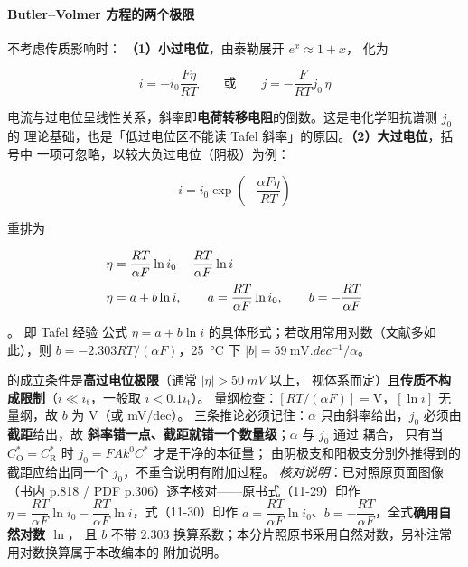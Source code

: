 \paragraph{Butler--Volmer 方程的两个极限} 不考虑传质影响时：
\textbf{（1）小过电位}，由泰勒展开 $e^x\approx1+x$， 化为

\begin{equation}
i=-i_0\frac{F\eta}{RT}
\qquad\text{或}\qquad
j=-\frac{F}{RT}j_0\,\eta
\label{eq:bv-linear}
\end{equation}

电流与过电位呈线性关系，斜率即\textbf{电荷转移电阻}的倒数。这是电化学阻抗谱测 $j_0$ 的
理论基础，也是「低过电位区不能读 Tafel 斜率」的原因。\textbf{（2）大过电位}，括号中
一项可忽略，以较大负过电位（阴极）为例：

\begin{equation}
i=i_0\exp\!\left(-\frac{\alpha F\eta}{RT}\right)
\label{eq:bv-cathodic}
\end{equation}

重排为

\begin{align}
\eta&=\frac{RT}{\alpha F}\ln i_0-\frac{RT}{\alpha F}\ln i
\label{eq:tafel}\\[2pt]
\eta&=a+b\ln i,\qquad
a=\frac{RT}{\alpha F}\ln i_0,\qquad b=-\frac{RT}{\alpha F}\notag
\end{align}

。 即 Tafel 经验
公式 $\eta=a+b\ln i$ 的具体形式；若改用常用对数（文献多如此），则
$b=-2.303RT/(\alpha F)$，\qty{25}{\celsius} 下 $|b|=\qty{59}{\mV.dec^{-1}}/\alpha$。

\begin{keycond}
 的成立条件是\textbf{高过电位极限}（通常 $|\eta|>\qty{50}{mV}$ 以上，
视体系而定）且\textbf{传质不构成限制}（$i\ll i_{\mathrm{t}}$，一般取 $i<0.1i_{\mathrm{t}}$）。
量纲检查：$[RT/(\alpha F)]=\mathrm{V}$，$[\ln i]$ 无量纲，故 $b$ 为 V（或 mV/dec）。
三条推论必须记住：$\alpha$ 只由斜率给出，$j_0$ 必须由\textbf{截距}给出，故
\textbf{斜率错一点、截距就错一个数量级}；$\alpha$ 与 $j_0$ 通过  耦合，
只有当 $C_{\mathrm{O}}^*=C_{\mathrm{R}}^*$ 时 $j_0=FAk^0C^*$ 才是干净的本征量；
由阴极支和阳极支分别外推得到的截距应给出同一个 $j_0$，不重合说明有附加过程。
\emph{核对说明}：已对照原页面图像（书内 p.818 / PDF p.306）逐字核对——原书式（11-29）印作
$\eta=\dfrac{RT}{\alpha F}\ln i_0-\dfrac{RT}{\alpha F}\ln i$，式（11-30）印作
$a=\dfrac{RT}{\alpha F}\ln i_0$、$b=-\dfrac{RT}{\alpha F}$，全式\textbf{确用自然对数 $\ln$}，
且 $b$ 不带 $2.303$ 换算系数；本分片照原书采用自然对数，另补注常用对数换算属于本改编本的
附加说明。
\end{keycond}

